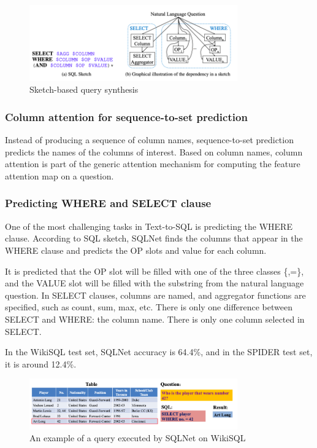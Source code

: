 \begin{figure}[htb]
    \centering
    \includegraphics[width=0.8\textwidth]{pics/sqlnet/sketch-based.png}
    \caption{Sketch-based query synthesis\cite{xu_sqlnet_2017}}
    \label{fig:sketch-based}
\end{figure}

\subsubsection*{Column attention for sequence-to-set prediction}

Instead of producing a sequence of column names, sequence-to-set prediction predicts the names of the columns of interest.
Based on column names, column attention is part of the generic attention mechanism for computing the feature attention map on a question.

\subsubsection*{Predicting WHERE and SELECT clause}

One of the most challenging tasks in Text-to-SQL is predicting the WHERE clause.
According to SQL sketch, SQLNet finds the columns that appear in the WHERE clause and predicts the OP slots and value for each column.

It is predicted that the OP slot will be filled with one of the three classes \{<,>,=\}, and the VALUE slot will be filled with the substring from the natural language question.
In SELECT clauses, columns are named, and aggregator functions are specified, such as count, sum, max, etc. There is only one difference between SELECT and WHERE: the column name. There is only one column selected in SELECT.

In the WikiSQL test set, SQLNet accuracy is 64.4\%, and in the SPIDER test set, it is around 12.4\%.

\begin{figure}[htb]
    \centering
    \includegraphics[width=0.8\textwidth]{pics/sqlnet/sqlnet-task.png}
    \caption{An example of a query executed by SQLNet on WikiSQL\cite{xu_sqlnet_2017}}
    \label{fig:sqlnet-task}
\end{figure}